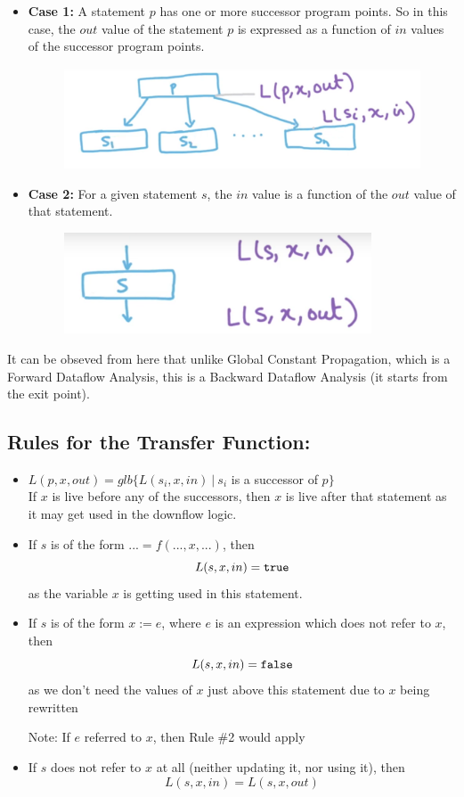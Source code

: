 \begin{itemize}
    \item \textbf{Case 1:} A statement $p$ has one or more successor program points. So in this case, the $out$ value of the statement $p$ is expressed as a function of $in$ values of the successor program points.
    \begin{figure}[H]
        \centering
        \includegraphics[height=3cm]{images/Module82_1.png}
    \end{figure}

    \item \textbf{Case 2:} For a given statement $s$, the $in$ value is a function of the $out$ value of that statement.
    \begin{figure}[H]
        \centering
        \includegraphics[height=3cm]{images/Module82_2.png}
    \end{figure}

\end{itemize}
It can be obseved from here that unlike Global Constant Propagation, which is a Forward Dataflow Analysis, this is a Backward Dataflow Analysis (it starts from the exit point).

\subsection{Rules for the Transfer Function:}
\begin{itemize}
    \item $L(p, x, out) = glb\{L(s_i, x, in)~|~s_i$ is a successor of $p\}$\\
    
    If $x$ is live before any of the successors, then $x$ is live after that statement as it may get used in the downflow logic.
    \item If $s$ is of the form $... = f(...,x,...)$, then $$L(s, x, in) = {\tt true}$$ as the variable $x$ is getting used in this statement.
    \item If $s$ is of the form $x := e$, where $e$ is an expression which does not refer to $x$, then $$L(s, x, in) = {\tt false}$$ as we don't need the values of $x$ just above this statement due to $x$ being rewritten
    
    Note: If $e$ referred to $x$, then Rule \#2 would apply
    \item If $s$ does not refer to $x$ at all (neither updating it, nor using it), then $$L(s, x, in) = L(s, x, out)$$
\end{itemize}


